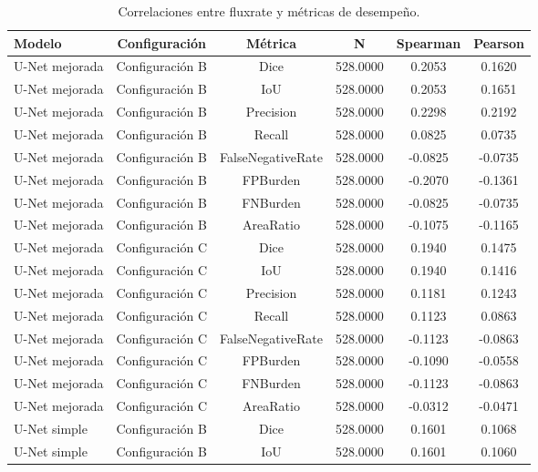\begin{table}[H]
    \centering
    \small
    \caption{Correlaciones entre fluxrate y métricas de desempeño.}
    \label{tab:correlaciones_fluxrate}
    \begin{tabular}{lccccc}
        \toprule
        Modelo & Configuración & Métrica & N & Spearman & Pearson \\
        \midrule
        U-Net mejorada & Configuración B & Dice & 528.0000 & 0.2053 & 0.1620 \\
        U-Net mejorada & Configuración B & IoU & 528.0000 & 0.2053 & 0.1651 \\
        U-Net mejorada & Configuración B & Precision & 528.0000 & 0.2298 & 0.2192 \\
        U-Net mejorada & Configuración B & Recall & 528.0000 & 0.0825 & 0.0735 \\
        U-Net mejorada & Configuración B & FalseNegativeRate & 528.0000 & -0.0825 & -0.0735 \\
        U-Net mejorada & Configuración B & FPBurden & 528.0000 & -0.2070 & -0.1361 \\
        U-Net mejorada & Configuración B & FNBurden & 528.0000 & -0.0825 & -0.0735 \\
        U-Net mejorada & Configuración B & AreaRatio & 528.0000 & -0.1075 & -0.1165 \\
        U-Net mejorada & Configuración C & Dice & 528.0000 & 0.1940 & 0.1475 \\
        U-Net mejorada & Configuración C & IoU & 528.0000 & 0.1940 & 0.1416 \\
        U-Net mejorada & Configuración C & Precision & 528.0000 & 0.1181 & 0.1243 \\
        U-Net mejorada & Configuración C & Recall & 528.0000 & 0.1123 & 0.0863 \\
        U-Net mejorada & Configuración C & FalseNegativeRate & 528.0000 & -0.1123 & -0.0863 \\
        U-Net mejorada & Configuración C & FPBurden & 528.0000 & -0.1090 & -0.0558 \\
        U-Net mejorada & Configuración C & FNBurden & 528.0000 & -0.1123 & -0.0863 \\
        U-Net mejorada & Configuración C & AreaRatio & 528.0000 & -0.0312 & -0.0471 \\
        U-Net simple & Configuración B & Dice & 528.0000 & 0.1601 & 0.1068 \\
        U-Net simple & Configuración B & IoU & 528.0000 & 0.1601 & 0.1060 \\

\end{tabular}
\end{table}
